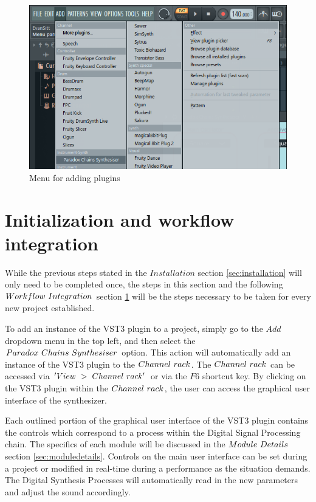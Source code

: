 \documentclass[a4paper,12pt]{report}
\begin{document}
\begin{figure}[h] \centering
\includegraphics[width=32em]{AddPluginList.png}
    \caption{Menu for adding plugins}     \label{fig:addplugin} \end{figure}

\section{Initialization and workflow integration}
\label{sec:initandworkflow}
While the previous steps stated in the $Installation$ section \ref{sec:installation} will only need to be completed once, the steps in this section and the following $Workflow\ \-Integration$ section \ref{sec:initandworkflow} will be the steps necessary to be taken for every new project established.

To add an instance of the VST3 plugin to a project, simply go to the $Add$ dropdown menu in the top left, and then select the $Paradox\ \-Chains\ \-Synthesiser$ option. This action will automatically add an instance of the VST3 plugin to the $Channel\ \-rack$. The $Channel\ \-rack$ can be accessed via $'View\ \->\ \-Channel\ \-rack'$ or via the $F6$ shortcut key. By clicking on the VST3 plugin within the $Channel\ \-rack$, the user can access the graphical user interface of the synthesizer.

Each outlined portion of the graphical user interface of the VST3 plugin contains the controls which correspond to a process within the Digital Signal Processing chain. The specifics of each module will be discussed in the $Module\ \-Details$ section \ref{sec:moduledetails}. Controls on the main user interface can be set during a project or modified in real-time during a performance as the situation demands. The Digital Synthesis Processes will automatically read in the new parameters and adjust the sound accordingly.
\end{document}
